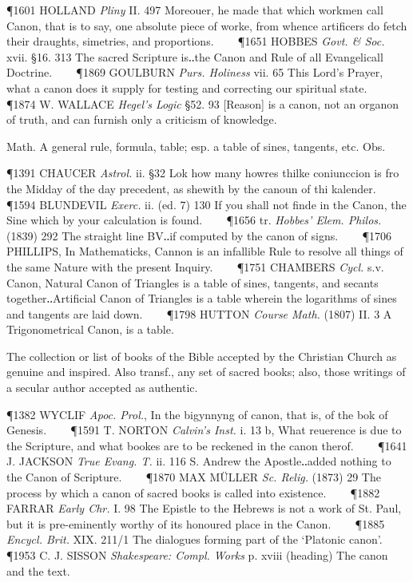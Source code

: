 \begin{description}[wide, labelwidth=!, labelindent=0pt]
\begin{myenumerate}
\P 1601 HOLLAND  \textit{Pliny} II. 497 Moreouer, he made that which workmen call Canon, that is to say, one absolute piece of worke, from whence artificers do fetch their draughts, simetries, and proportions.    
\P 1651 HOBBES  \textit{Govt. \& Soc.} xvii. §16. 313 The sacred Scripture is‥the Canon and Rule of all Evangelicall Doctrine.    
\P 1869 GOULBURN  \textit{Purs. Holiness} vii. 65 This Lord's Prayer, what a canon does it supply for testing and correcting our spiritual state.    
\P 1874 W. WALLACE  \textit{Hegel's Logic} §52. 93 [Reason] is a canon, not an organon of truth, and can furnish only a criticism of knowledge.

 Math. A general rule, formula, table; esp. a table of sines, tangents, etc. Obs.

\P 1391 CHAUCER  \textit{Astrol.} ii. §32 Lok how many howres thilke coniunccion is fro the Midday of the day precedent, as shewith by the canoun of thi kalender.    
\P 1594 BLUNDEVIL  \textit{Exerc.} ii. (ed. 7) 130 If you shall not finde in the Canon, the Sine which by your calculation is found.    
\P 1656 tr. \textit{Hobbes' Elem. Philos.} (1839) 292 The straight line BV‥if computed by the canon of signs.    
\P 1706 PHILLIPS, In Mathematicks, Cannon is an infallible Rule to resolve all things of the same Nature with the present Inquiry.    
\P 1751 CHAMBERS  \textit{Cycl.} s.v. Canon, Natural Canon of Triangles is a table of sines, tangents, and secants together‥Artificial Canon of Triangles is a table wherein the logarithms of sines and tangents are laid down.    
\P 1798 HUTTON  \textit{Course Math.} (1807) II. 3 A Trigonometrical Canon, is a table.

 The collection or list of books of the Bible accepted by the Christian Church as genuine and inspired. Also transf., any set of sacred books; also, those writings of a secular author accepted as authentic.

\P 1382 WYCLIF  \textit{Apoc. Prol.}, In the bigynnyng of canon, that is, of the bok of Genesis.    
\P 1591 T. NORTON  \textit{Calvin's Inst.} i. 13 b, What reuerence is due to the Scripture, and what bookes are to be reckened in the canon therof.    
\P 1641 J. JACKSON  \textit{True Evang. T.} ii. 116 S. Andrew the Apostle‥added nothing to the Canon of Scripture.    
\P 1870 MAX  MÜLLER \textit{Sc. Relig.} (1873) 29 The process by which a canon of sacred books is called into existence.    
\P 1882 FARRAR  \textit{Early Chr.} I. 98 The Epistle to the Hebrews is not a work of St. Paul, but it is pre-eminently worthy of its honoured place in the Canon.    
\P 1885 \textit{Encycl. Brit.} XIX. 211/1 The dialogues forming part of the ‘Platonic canon’.    
\P 1953 C. J. SISSON  \textit{Shakespeare: Compl. Works} p. xviii (heading) The canon and the text.


\end{myenumerate}
\end{description}
